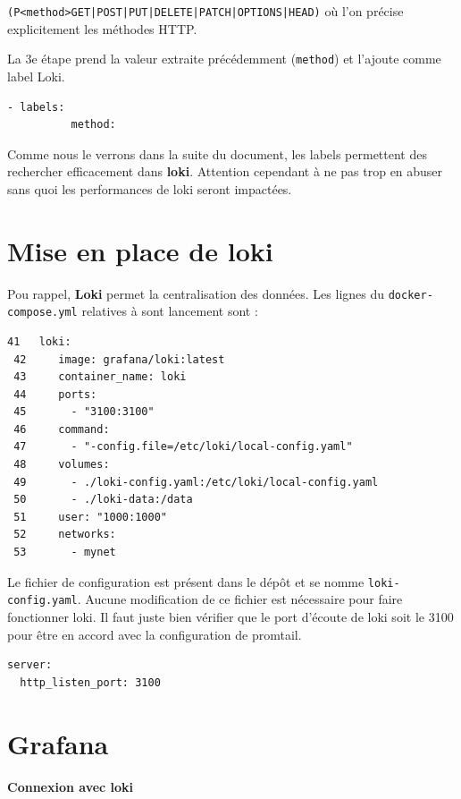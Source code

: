 \documentclass[french, 12pt]{article}%
\begin{document}
\verb?(P<method>GET|POST|PUT|DELETE|PATCH|OPTIONS|HEAD)? où l'on précise explicitement les méthodes HTTP. 



La 3e étape prend la valeur extraite précédemment (\verb?method?) et l'ajoute comme label Loki.
\begin{lstlisting}[style=commande]
      - labels:
          method:
\end{lstlisting}



Comme nous le verrons dans la suite du document, les labels permettent des rechercher efficacement dans \textbf{loki}. Attention cependant à ne pas trop en abuser sans quoi les performances de loki seront impactées. 

\section{Mise en place de loki}

Pou rappel, \textbf{Loki} permet la centralisation des données. Les lignes du \verb?docker-compose.yml? relatives à sont lancement sont : 
\begin{lstlisting}[style=commande]
 41   loki:
 42     image: grafana/loki:latest
 43     container_name: loki
 44     ports:
 45       - "3100:3100"
 46     command:
 47       - "-config.file=/etc/loki/local-config.yaml"
 48     volumes:
 49       - ./loki-config.yaml:/etc/loki/local-config.yaml
 50       - ./loki-data:/data       
 51     user: "1000:1000"
 52     networks:
 53       - mynet
\end{lstlisting}


Le fichier de configuration est présent dans le dépôt et se nomme \verb?loki-config.yaml?. Aucune modification de ce fichier est nécessaire pour faire fonctionner loki. Il faut juste bien vérifier que le port d'écoute de loki soit le 3100
pour être en accord avec la configuration de promtail.
\begin{lstlisting}[style=commande]
server:
  http_listen_port: 3100
\end{lstlisting}



\section{Grafana}

\paragraph{Connexion avec loki} \ 
\end{document}
